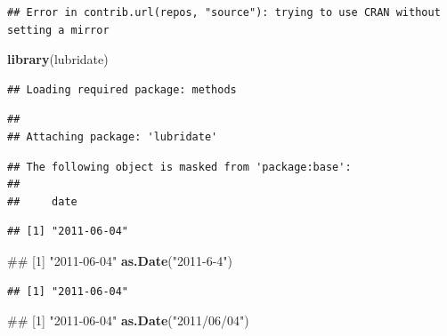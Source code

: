 \documentclass[10pt,]{krantz}
\makeatletter
\newenvironment{Shaded}{\begin{snugshade}}{\end{snugshade}}
\newcommand{\KeywordTok}[1]{\textcolor[rgb]{0.13,0.29,0.53}{\textbf{#1}}}
\newcommand{\StringTok}[1]{\textcolor[rgb]{0.31,0.60,0.02}{#1}}
\newcommand{\CommentTok}[1]{\textcolor[rgb]{0.56,0.35,0.01}{\textit{#1}}}
\newcommand{\NormalTok}[1]{#1}
\newenvironment{kframe}{%
\medskip{}
\setlength{\fboxsep}{.8em}
 \def\at@end@of@kframe{}%
 \ifinner\ifhmode%
  \def\at@end@of@kframe{\end{minipage}}%
  \begin{minipage}{\columnwidth}%
 \fi\fi%
 \def\FrameCommand##1{\hskip\@totalleftmargin \hskip-\fboxsep
 \colorbox{shadecolor}{##1}\hskip-\fboxsep
     \hskip-\linewidth \hskip-\@totalleftmargin \hskip\columnwidth}%
 \MakeFramed {\advance\hsize-\width
   \@totalleftmargin\z@ \linewidth\hsize
   \@setminipage}}%
 {\par\unskip\endMakeFramed%
 \at@end@of@kframe}
\renewenvironment{Shaded}{\begin{kframe}}{\end{kframe}}
\makeatother
\begin{document}
\begin{verbatim}
## Error in contrib.url(repos, "source"): trying to use CRAN without setting a mirror
\end{verbatim}

\begin{Shaded}
\begin{Highlighting}[]
\KeywordTok{library}\NormalTok{(lubridate)}
\end{Highlighting}
\end{Shaded}

\begin{verbatim}
## Loading required package: methods
\end{verbatim}

\begin{verbatim}
## 
## Attaching package: 'lubridate'
\end{verbatim}

\begin{verbatim}
## The following object is masked from 'package:base':
## 
##     date
\end{verbatim}

\begin{Shaded}
\end{Shaded}

\begin{verbatim}
## [1] "2011-06-04"
\end{verbatim}

\begin{Shaded}
\begin{Highlighting}[]
\NormalTok{## [1] "2011-06-04"}
\KeywordTok{as.Date}\NormalTok{(}\StringTok{"2011-6-4"}\NormalTok{)}
\end{Highlighting}
\end{Shaded}

\begin{verbatim}
## [1] "2011-06-04"
\end{verbatim}

\begin{Shaded}
\begin{Highlighting}[]
\NormalTok{## [1] "2011-06-04"}
\KeywordTok{as.Date}\NormalTok{(}\StringTok{"2011/06/04"}\NormalTok{)}
\end{Highlighting}
\end{Shaded}
\end{document}

